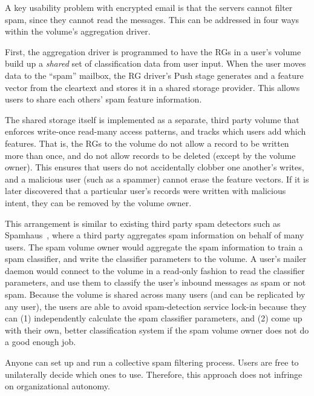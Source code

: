 A key usability problem with encrypted email is that the servers cannot filter spam,
since they cannot read the messages.  This can be addressed in four ways within
the volume's aggregation driver.

\hfill \break
{}
\hfill \break

First, the aggregation driver is programmed to have the RGs in a user's volume build
up a \emph{shared} set of classification data from user input.  When the user
moves data to the ``spam'' mailbox, the RG driver's Push stage generates and
a feature vector from the cleartext and stores it in a shared storage
provider.  This allows
users to share each others' spam feature information.

The shared storage itself is implemented as a separate, third party volume that enforces write-once read-many
access patterns, and tracks which users add which features.  That is, the RGs to the volume do not allow a record to be
written more than once, and do not allow records to be deleted (except by the
volume owner).  This ensures
that users do not accidentally clobber one another's writes, and a malicious
user (such as a spammer) cannot erase the feature vectors.  If it is later
discovered that a particular user's records were written with malicious intent,
they can be removed by the volume owner.

This arrangement is similar to existing third party spam detectors such as
Spamhaus~\cite{spamhaus}, where a third party aggregates spam information 
on behalf of many users.  The spam volume owner would aggregate the spam
information to train a spam classifier, and write the classifier parameters
to the volume.  A user's mailer daemon would connect to the volume in a read-only fashion
to read the classifier parameters, and use them to classify the user's inbound
messages as spam or not spam.  Because the volume is shared across many users
(and can be replicated by any user), the users are able to avoid spam-detection
service lock-in because they can (1) independently calculate the spam classifier
parameters, and (2) come up with their own, better classification system if the
spam volume owner does not do a good enough job.

Anyone can set up and run a collective spam filtering process.  Users are free
to unilaterally decide which ones to use.  Therefore, this approach does not
infringe on organizational autonomy.

\hfill \break
{}
\hfill \break

